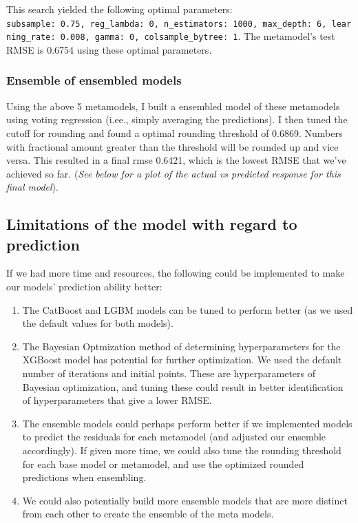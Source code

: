 \documentclass[
  letterpaper,
  DIV=11,
  numbers=noendperiod]{scrartcl}
\begin{document}
This search yielded the following optimal parameters:
\texttt{\textquotesingle{}subsample\textquotesingle{}:\ 0.75,\ \textquotesingle{}reg\_lambda\textquotesingle{}:\ 0,\ \textquotesingle{}n\_estimators\textquotesingle{}:\ 1000,\ \textquotesingle{}max\_depth\textquotesingle{}:\ 6,\ \textquotesingle{}learning\_rate\textquotesingle{}:\ 0.008,\ \textquotesingle{}gamma\textquotesingle{}:\ 0,\ \textquotesingle{}colsample\_bytree\textquotesingle{}:\ 1}.
The metamodel's test RMSE is 0.6754 using these optimal parameters.

\hypertarget{ensemble-of-ensembled-models}{%
\subsubsection{Ensemble of ensembled
models}\label{ensemble-of-ensembled-models}}

Using the above 5 metamodels, I built a ensembled model of these
metamodels using voting regression (i.ee., simply averaging the
predictions). I then tuned the cutoff for rounding and found a optimal
rounding threshold of 0.6869. Numbers with fractional amount greater
than the threshold will be rounded up and vice versa. This resulted in a
final rmse 0.6421, which is the lowest RMSE that we've achieved so far.
(\emph{See below for a plot of the actual vs predicted response for this
final model}).

\hypertarget{limitations-of-the-model-with-regard-to-prediction}{%
\subsection{Limitations of the model with regard to
prediction}\label{limitations-of-the-model-with-regard-to-prediction}}

If we had more time and resources, the following could be implemented to
make our models' prediction ability better:

\begin{enumerate}
\def\labelenumi{\arabic{enumi}.}
\item
  The CatBoost and LGBM models can be tuned to perform better (as we
  used the default values for both models).
\item
  The Bayesian Optmization method of determining hyperparameters for the
  XGBoost model has potential for further optimization. We used the
  default number of iterations and initial points. These are
  hyperparameters of Bayesian optimization, and tuning these could
  result in better identification of hyperparameters that give a lower
  RMSE.
\item
  The ensemble models could perhaps perform better if we implemented
  models to predict the residuals for each metamodel (and adjusted our
  ensemble accordingly). If given more time, we could also tune the
  rounding threshold for each base model or metamodel, and use the
  optimized rounded predictions when ensembling.
\item
  We could also potentially build more ensemble models that are more
  distinct from each other to create the ensemble of the meta models.
\end{enumerate}
\end{document}
